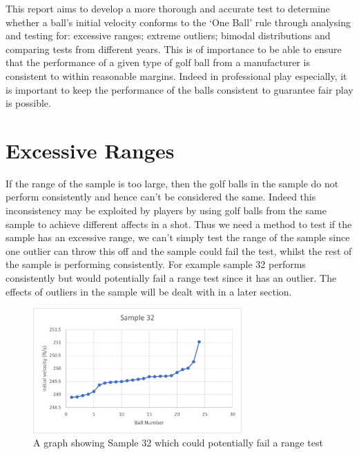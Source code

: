 \documentclass[11pt]{article}
\begin{document}
This report aims to develop a more thorough and accurate test to determine whether a ball’s initial velocity conforms to the ‘One Ball’ rule through analysing and testing for: excessive ranges; extreme outliers; bimodal distributions and comparing tests from different years.
This is of importance to be able to ensure that the performance of a given type of golf ball from a manufacturer is consistent to within reasonable margins. Indeed in professional play especially, it is important to keep the performance of the balls consistent to guarantee fair play is possible.




\newpage

\section{Excessive Ranges}

If the range of the sample is too large, then the golf balls in the sample do not perform consistently and hence can’t be considered the same. Indeed this inconsistency may be exploited by players by using golf balls from the same sample to achieve different affects in a shot. Thus we need a method to test if the sample has an excessive range, we can’t simply test the range of the sample since one outlier can throw this off and the sample could fail the test, whilst the rest of the sample is performing consistently. For example sample 32 performs consistently but would potentially fail a range test since it has an outlier. The effects of outliers in the sample will be dealt with in a later section.


\begin{figure}[H]
    \centering
    \includegraphics[width=80mm]{Sample32.png}
    \caption{A graph showing Sample 32 which could potentially fail a range test}
    \label{figure 2}
\end{figure}
\end{document}
